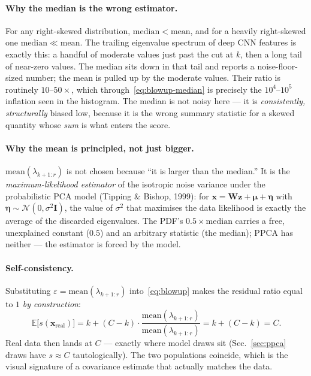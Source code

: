 \documentclass[11pt]{article}
\newcommand{\bmu}{\boldsymbol{\mu}}
\begin{document}
\paragraph{Why the median is the wrong estimator.}
For any right-skewed distribution, $\mathrm{median} < \mathrm{mean}$, and for a
heavily right-skewed one $\mathrm{median} \ll \mathrm{mean}$. The trailing
eigenvalue spectrum of deep CNN features is exactly this: a handful of moderate
values just past the cut at $k$, then a long tail of near-zero values. The median
sits down in that tail and reports a noise-floor-sized number; the mean is pulled
up by the moderate values. Their ratio is routinely $10$--$50\times$, which
through~\eqref{eq:blowup-median} is precisely the $10^4$--$10^5$ inflation seen in
the histogram. The median is not noisy here --- it is \emph{consistently,
structurally} biased low, because it is the wrong summary statistic for a skewed
quantity whose \emph{sum} is what enters the score.

\paragraph{Why the mean is principled, not just bigger.}
$\mathrm{mean}(\lambda_{k+1:r})$ is not chosen because ``it is larger than the
median.'' It is the \emph{maximum-likelihood estimator} of the isotropic noise
variance under the probabilistic PCA model (Tipping \& Bishop, 1999): for
$\mathbf{x} = \mathbf{W}\mathbf{z} + \bmu + \boldsymbol{\eta}$ with
$\boldsymbol{\eta} \sim \mathcal{N}(0,\sigma^2 \mathbf{I})$, the value of
$\sigma^2$ that maximises the data likelihood is exactly the average of the
discarded eigenvalues. The PDF's $0.5 \times \mathrm{median}$ carries a free,
unexplained constant ($0.5$) and an arbitrary statistic (the median); PPCA has
neither --- the estimator is forced by the model.

\paragraph{Self-consistency.}
Substituting $\varepsilon = \mathrm{mean}(\lambda_{k+1:r})$
into~\eqref{eq:blowup} makes the residual ratio equal to $1$ \emph{by
construction}:
\begin{equation}
  \mathbb{E}\bigl[s(\mathbf{x}_{\text{real}})\bigr]
    = k + (C-k)\cdot
      \frac{\mathrm{mean}(\lambda_{k+1:r})}{\mathrm{mean}(\lambda_{k+1:r})}
    = k + (C-k) = C.
\end{equation}
Real data then lands at $C$ --- exactly where model draws sit (Sec.~\ref{sec:ppca}
draws have $s \approx C$ tautologically). The two populations coincide, which is
the visual signature of a covariance estimate that actually matches the data.
\end{document}
